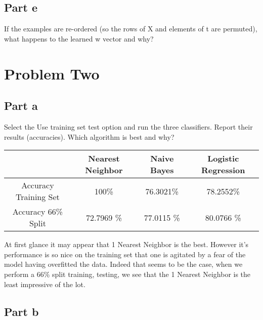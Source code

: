 \documentclass{article}
\begin{document}
\subsection{Part e}
If the examples are re-ordered (so the rows of X and elements of t are permuted), what happens to the learned w vector and why?

\section{Problem Two}
\subsection{Part a}
Select the Use training set test option and run the three classifiers. Report their results (accuracies). Which algorithm is best and why?

\begin{table}[htbp]
    \centering
  
    \begin{tabular}{|c|c|c|c|}
    \hline
        & Nearest Neighbor & Naive Bayes & Logistic Regression \\ 
            \hline
         Accuracy Training Set&  100\%&76.3021\%&78.2552\%   \\ 
         Accuracy 66\% Split &  72.7969 \% &77.0115 \%&80.0766 \%
             \hline
      
    \end{tabular}
\end{table}
At first glance it may appear that 1 Nearest Neighbor is the best. However it's performance is so nice on the training set that one is agitated by a fear of the model having overfitted the data. Indeed that seems to be the case, when we perform a 66\% split training, testing, we see that the 1 Nearest Neighbor is the least impressive of the lot. 

\subsection{Part b}
\end{document}
